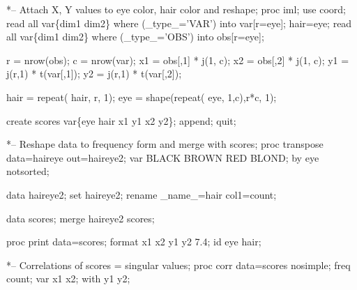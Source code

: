 \begin{listing}
*-- Attach X, Y values to eye color, hair color and reshape;
proc iml;
   use coord;
   read all var\{dim1 dim2\} where (_type_='VAR') into var[r=eye]; hair=eye;
   read all var\{dim1 dim2\} where (_type_='OBS') into obs[r=eye];
   
   r = nrow(obs);
   c = nrow(var);
   x1 = obs[,1] * j(1, c);
   x2 = obs[,2] * j(1, c);
   y1 = j(r,1)  * t(var[,1]);
   y2 = j(r,1)  * t(var[,2]);
   
   hair = repeat( hair, r, 1);
   eye  = shape(repeat( eye, 1,c),r*c, 1);

   create scores var\{eye hair x1 y1 x2 y2\};
   append;
   quit;

*-- Reshape data to frequency form and merge with scores;
proc transpose data=haireye out=haireye2;
   var BLACK BROWN RED BLOND;
   by eye notsorted;

data haireye2;
   set haireye2;
   rename _name_=hair col1=count;

data scores;
   merge haireye2 scores;

proc print data=scores;
   format x1 x2 y1 y2 7.4;
   id eye hair;

*-- Correlations of scores = singular values;
proc corr data=scores nosimple;
   freq count;
   var x1 x2;
   with y1 y2;   

\end{listing}
